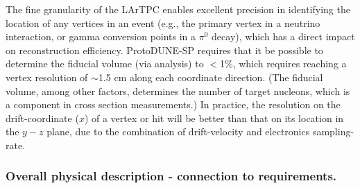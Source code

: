 
The fine granularity of the LArTPC enables excellent precision in identifying the location of any vertices in an event (e.g., the primary vertex in a neutrino interaction, or gamma conversion points in a $\pi^{0}$ decay), which has a direct impact on reconstruction efficiency. ProtoDUNE-SP requires that it be possible to determine the fiducial volume (via analysis) to $<$1$\%$, which requires reaching a vertex resolution of $\sim$1.5 cm along each coordinate direction. (The fiducial volume, among other factors, determines the number of target nucleons, which is a component in cross section measurements.) In practice, the resolution on the drift-coordinate ($x$) of a vertex or hit will be better than that on its location in the $y-z$ plane, due to the combination of drift-velocity and electronics sampling-rate.


\subsubsection{Overall physical description - connection to requirements.}
\label{subsec:apa_phys_desc}

